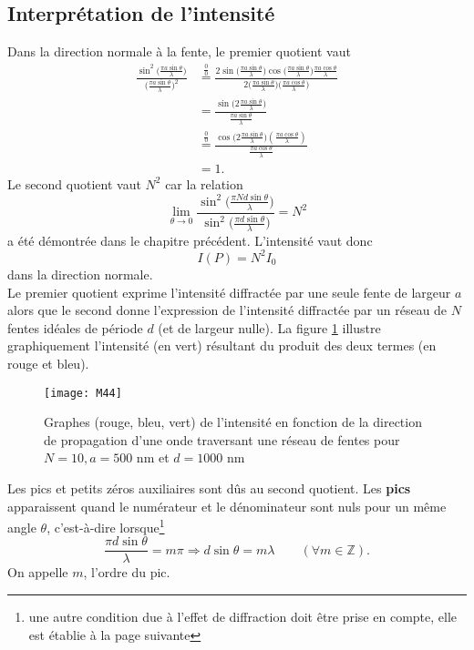 \subsection{Interprétation de l'intensité}
Dans la direction normale à la fente, le premier quotient vaut
\begin{align*}
\frac{\sin^2\big(\frac{\pi a\sin \theta}{\lambda}\big)}{\big(\frac{\pi a\sin\theta}{\lambda}\big)^2}&\overset{\frac{0}{0}}{=}\frac{2\sin\big(\frac{\pi a\sin \theta}{\lambda}\big)\cos\big(\frac{\pi a\sin \theta}{\lambda}\big)\frac{\pi a\cos \theta}{\lambda}}{2\big(\frac{\pi a\sin\theta}{\lambda}\big)\big(\frac{\pi a\cos\theta}{\lambda}\big)}\\
&=\frac{\sin\big(2\frac{\pi a\sin \theta}{\lambda}\big)}{\frac{\pi a\sin \theta}{\lambda}}\\
&\overset{\frac{0}{0}}{=}\frac{\cos\big(2\frac{\pi a\sin \theta}{\lambda}\big)(\frac{\pi a\cos \theta}{\lambda})}{\frac{\pi a\cos \theta}{\lambda}}\\
&=1.
\end{align*}
Le second quotient vaut $N^2$ car la relation
$$
\lim_{\theta \rightarrow 0}\frac{\sin^2\big(\frac{\pi Nd\sin \theta}{\lambda}\big)}{\sin^2\big(\frac{\pi d\sin \theta}{\lambda}\big)}=N^2
$$
a été démontrée dans le chapitre précédent.
L'intensité vaut donc
$$
    I(P)=N^2I_0
$$
dans la direction normale.\\

\noindent Le premier quotient exprime l'intensité diffractée par une seule fente de largeur $a$ alors que le second donne l'expression de l'intensité diffractée par un réseau de $N$ fentes idéales de période $d$ (et de largeur nulle). La figure \ref{d11} illustre graphiquement l'intensité (en vert) résultant du produit des deux termes (en rouge et bleu).

\begin{figure}[h!]
    \centering
    \texttt{[image: M44]}
    \caption{Graphes (rouge, bleu, vert) de l'intensité en fonction de la direction de propagation d'une onde traversant une réseau de fentes pour $N=10, a=500$ nm et $d=1000$ nm}
    \label{d11}
\end{figure}

\noindent Les pics et petits zéros auxiliaires sont dûs au second quotient. Les \textbf{pics} apparaissent quand le numérateur et le dénominateur sont nuls pour un même angle $\theta$, c'est-à-dire lorsque\footnote{une autre condition due à l'effet de diffraction doit être prise en compte, elle est établie à la page suivante}
$$
    \frac{\pi d\sin \theta}{\lambda}=m\pi\Rightarrow d\sin \theta=m\lambda \qquad(\forall m\in  \mathbb{Z}).
$$
On appelle $m$, l'ordre du pic.

